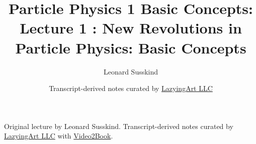 \documentclass[11pt,oneside]{book}
\begin{document}
\frontmatter
\title{Particle Physics 1 Basic Concepts: Lecture 1 : New Revolutions in Particle Physics: Basic Concepts}
\author{Leonard Susskind}
\date{Transcript-derived notes curated by \href{https://lazying.art}{LazyingArt LLC}}
\maketitle
\begin{center}
\small Original lecture by Leonard Susskind. Transcript-derived notes curated by \href{https://lazying.art}{LazyingArt LLC} with \href{https://github.com/lachlanchen/Video2Book}{Video2Book}.
\end{center}
\clearpage
\mainmatter

\end{document}
